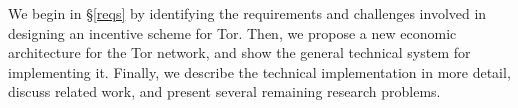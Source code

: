 We begin in \S\ref{reqs} by identifying the requirements and challenges involved
in designing an incentive scheme for Tor. Then, we propose a new economic architecture for the Tor network, and show the general technical system for implementing it. Finally, we describe the technical implementation in more detail, discuss related work, and present several remaining research problems.
